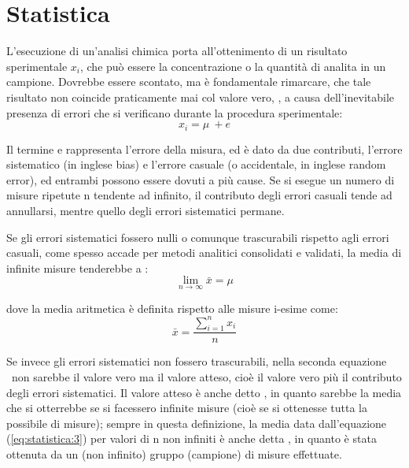 
\chapter{Statistica} 

L'esecuzione di un'analisi chimica porta all'ottenimento di un risultato sperimentale $x_i$, che può essere la concentrazione o la quantità di analita in un campione. Dovrebbe essere scontato, ma è fondamentale rimarcare, che tale risultato non coincide praticamente mai col valore vero, \mu, a causa dell'inevitabile presenza di errori che si verificano durante la procedura sperimentale:
\begin{equation} \label{eq:statistica:1}
x_i = \mu\ + e
\end{equation}

Il termine e rappresenta l'errore della misura, ed è dato da due contributi, l'errore sistematico (in inglese bias) e l'errore casuale (o accidentale, in inglese random error), ed entrambi possono essere dovuti a più cause. Se si esegue un numero di misure ripetute n tendente ad infinito, il contributo degli errori casuali tende ad annullarsi, mentre quello degli errori sistematici permane.

Se gli errori sistematici fossero nulli o comunque trascurabili rispetto agli errori casuali, come spesso accade per metodi analitici consolidati e validati, la media di infinite misure tenderebbe a \mu:
\begin{equation} \label{eq:statistica:2}
\lim_{n\to\infty} \bar{x} = \mu
\end{equation}

dove la media aritmetica è definita rispetto alle misure i-esime come:
\begin{equation} \label{eq:statistica:3}
\bar{x} = \frac{\sum_{i=1}^n x_i}{n}
\end{equation}

Se invece gli errori sistematici non fossero trascurabili, nella seconda equazione \mu\ non sarebbe il valore vero ma il valore atteso, cioè il valore vero più il contributo degli errori sistematici. Il valore atteso è anche detto , in quanto sarebbe la media che si otterrebbe se si facessero infinite misure (cioè se si ottenesse tutta la  possibile di misure); sempre in questa definizione, la media data dall'equazione (\ref{eq:statistica:3}) per valori di n non infiniti è anche detta , in quanto è stata ottenuta da un (non infinito) gruppo (campione) di misure effettuate.

